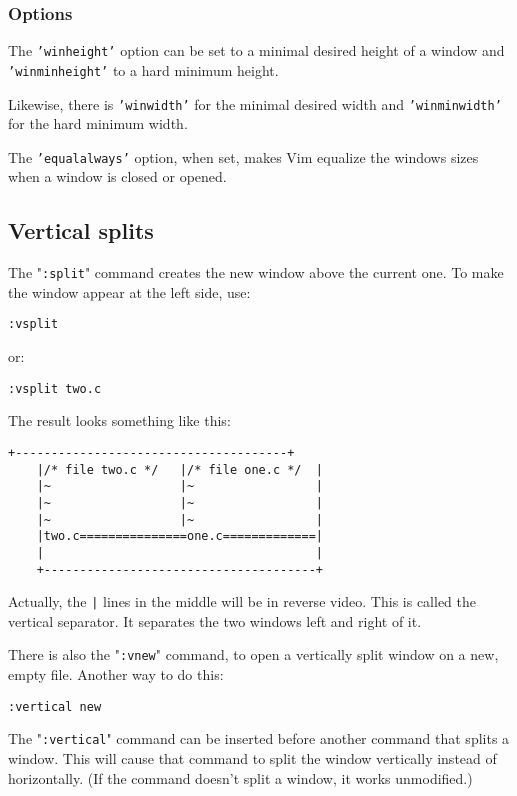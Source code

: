 \subsubsection{Options}
The \texttt{'winheight'} option can be set to a minimal desired height of a window and \texttt{'winminheight'} to a hard minimum height.

Likewise, there is \texttt{'winwidth'} for the minimal desired width and \texttt{'winminwidth'} for the hard minimum width.

The \texttt{'equalalways'} option, when set, makes Vim equalize the windows sizes when a window is closed or opened.

\subsection{Vertical splits}
The "\texttt{:split}" command creates the new window above the current one.
To make the window appear at the left side, use:

 \begin{Verbatim}[samepage=true]
 :vsplit
 \end{Verbatim}

or:
 \begin{Verbatim}[samepage=true]
 :vsplit two.c
 \end{Verbatim}

The result looks something like this:

\begin{Verbatim}[samepage=true]
    +--------------------------------------+
    |/* file two.c */   |/* file one.c */  |
    |~                  |~                 |
    |~                  |~                 |
    |~                  |~                 |
    |two.c===============one.c=============|
    |                                      |
    +--------------------------------------+
\end{Verbatim}

Actually, the \texttt{|} lines in the middle will be in reverse video.
This is called the vertical separator.
It separates the two windows left and right of it.

There is also the "\texttt{:vnew}" command, to open a vertically split window on a new, empty file.
Another way to do this:

 \begin{Verbatim}[samepage=true]
 :vertical new
 \end{Verbatim}

The "\texttt{:vertical}" command can be inserted before another command that splits a window.
This will cause that command to split the window vertically instead of horizontally.
(If the command doesn't split a window, it works unmodified.)

